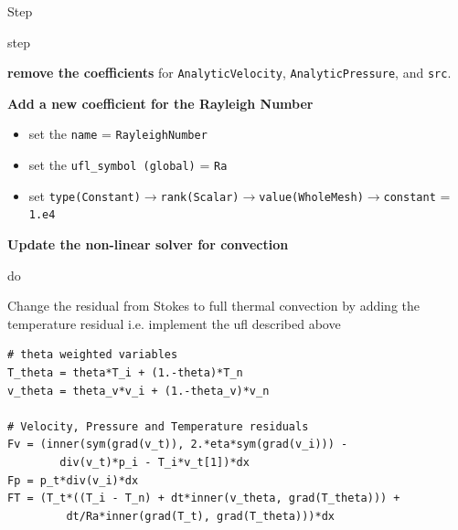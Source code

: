 \begin{steps}{Step}
\begin{steps}{step}
    \item \textbf{remove the coefficients} for \texttt{AnalyticVelocity},
      \texttt{AnalyticPressure}, and \texttt{src}.
    \item \textbf{Add a new coefficient for the Rayleigh Number}
      \begin{itemize}
      \item set the \texttt{name} = \texttt{RayleighNumber}
      \item set the \texttt{ufl\_symbol (global)} = \texttt{Ra}
      \item set
        \texttt{type(Constant)}$\rightarrow$\texttt{rank(Scalar)}$\rightarrow$\texttt{value(WholeMesh)}$\rightarrow$\texttt{constant}
        = \texttt{1.e4}
      \end{itemize}
    \item \textbf{Update the non-linear solver for convection}
    \begin{steps}{do}
    \item Change the residual from Stokes to full   thermal convection
      by adding the temperature residual i.e. implement the ufl
      described above 
\pagebreak{}
    \begin{lstlisting}[style=UFL]
# theta weighted variables
T_theta = theta*T_i + (1.-theta)*T_n
v_theta = theta_v*v_i + (1.-theta_v)*v_n

# Velocity, Pressure and Temperature residuals
Fv = (inner(sym(grad(v_t)), 2.*eta*sym(grad(v_i))) - 
        div(v_t)*p_i - T_i*v_t[1])*dx
Fp = p_t*div(v_i)*dx
FT = (T_t*((T_i - T_n) + dt*inner(v_theta, grad(T_theta))) + 
         dt/Ra*inner(grad(T_t), grad(T_theta)))*dx


\end{lstlisting}
\end{steps}
\end{steps}
\end{steps}
